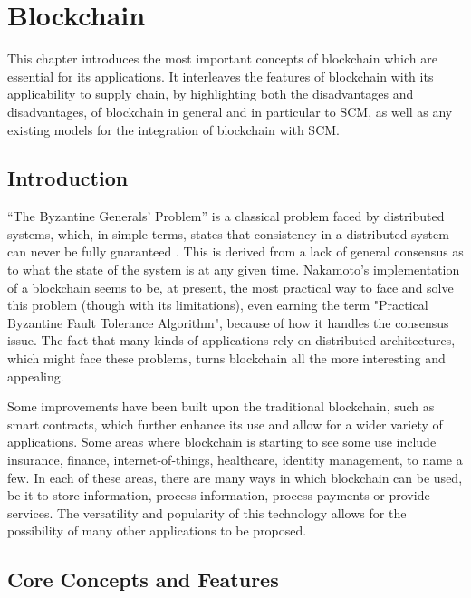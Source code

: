 \chapter{Blockchain}
\label{chap:blockchain}


This chapter introduces the most important concepts of blockchain which are essential for its applications. It interleaves the features of blockchain with its applicability to supply chain, by highlighting both the disadvantages and disadvantages, of blockchain in general and in particular to SCM, as well as any existing models for the integration of blockchain with SCM.

    \section{Introduction}
   “The Byzantine Generals' Problem” is a classical problem faced by distributed systems, which, in simple terms, states that consistency in a distributed system can never be fully guaranteed \cite{byzantine-generals-problem}. This is derived from a lack of general consensus as to what the state of the system is at any given time.
   Nakamoto's implementation of a blockchain seems to be, at present, the most practical way to face and solve this problem (though with its limitations), even earning the term "Practical Byzantine Fault Tolerance Algorithm", because of how it handles the consensus issue. The fact that many kinds of applications rely on distributed architectures, which might face these problems, turns blockchain all the more interesting and appealing. 
   
   Some improvements have been built upon the traditional blockchain, such as smart contracts, which further enhance its use and allow for a wider variety of applications. Some areas where blockchain is starting to see some use include insurance, finance, internet-of-things, healthcare, identity management, to name a few. 
   In each of these areas, there are many ways in which blockchain can be used, be it to store information, process information, process payments or provide services. The versatility and popularity of this technology allows for the possibility of many other applications to be proposed.

\section{Core Concepts and Features}

